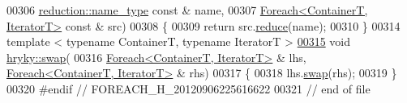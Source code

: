 \begin{DoxyCode}
00306     \hyperlink{classhryky_1_1reduction_1_1_string}{reduction::name_type} \textcolor{keyword}{const} & name,
00307     \hyperlink{classhryky_1_1_foreach}{Foreach<ContainerT, IteratorT>} \textcolor{keyword}{const} & src)
00308 \{
00309     \textcolor{keywordflow}{return} src.\hyperlink{classhryky_1_1_foreach_a13a52462dd8b0dddf02ea2784517bf7a}{reduce}(name);
00310 \}
00314 \textcolor{keyword}{template} < \textcolor{keyword}{typename} ContainerT, \textcolor{keyword}{typename} IteratorT >
\hypertarget{foreach_8h_source_l00315}{}\hyperlink{namespacehryky_aa7ddc0b2566f433d6c53ad6e1b7291d0}{00315} \textcolor{keywordtype}{void} \hyperlink{namespacehryky_a4282146df5ea2b68cb667896a2205909}{hryky::swap}(
00316     \hyperlink{classhryky_1_1_foreach}{Foreach<ContainerT, IteratorT>} & lhs, \hyperlink{classhryky_1_1_foreach}{Foreach<ContainerT, IteratorT>} & rhs)
00317 \{
00318     lhs.\hyperlink{classhryky_1_1_foreach_a3c8dd1fa22806ebb2966caeed1280960}{swap}(rhs);
00319 \}
00320 \textcolor{preprocessor}{#endif // FOREACH\_H\_20120906225616622}
00321 \textcolor{preprocessor}{}\textcolor{comment}{// end of file}
\end{DoxyCode}
